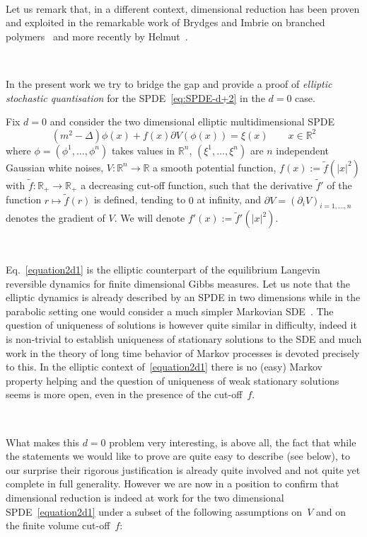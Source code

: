 \documentclass[a4paper,10pt]{article}
\newcommand{\assign}{:=}
\newcommand{\tmtextit}[1]{{\itshape{#1}}}
\begin{document}
\

Let us remark that, in a different context, dimensional reduction has been
proven and exploited in the remarkable work of Brydges and Imbrie on branched
polymers~{\cite{brydges_branched_2003,brydges_dimensional_2003}} and more
recently by Helmut~{\cite{helmuth_dimensional_2016}}.
 
\

In the present work we try to bridge the gap and provide a proof of
\tmtextit{elliptic stochastic quantisation} for the SPDE~{\eqref{eq:SPDE-d+2}}
in the $d = 0$ case.

Fix $d = 0$ and consider the two dimensional elliptic multidimensional SPDE
\begin{equation}
  (m^2 - \Delta) \phi (x) + f (x) \partial V (\phi (x)) = \xi (x)
  \label{equation2d1} \qquad x \in \mathbb{R}^2
\end{equation}
where $\phi = (\phi^1, \ldots, \phi^n)$ takes values in $\mathbb{R}^n$,
$(\xi^1, \ldots, \xi^n)$ are $n$ independent Gaussian white noises, $V :
\mathbb{R}^n \rightarrow \mathbb{R}$ a smooth potential function, $f (x)
\assign \tilde{f} (| x |^2)$ with $\tilde{f} : \mathbb{R}_+ \rightarrow
\mathbb{R}_+$ a decreasing cut-off function, such that the derivative
$\tilde{f}'$ of the function $r \longmapsto \tilde{f} (r)$ is defined, tending
to $0$ at infinity, and $\partial V = (\partial_i V)_{i = 1, \ldots, n}$
denotes the gradient of $V$. We will denote $f' (x) \assign \tilde{f}' (| x
|^2)$.

\

Eq.~{\eqref{equation2d1}} is the elliptic counterpart of the equilibrium
Langevin reversible dynamics for finite dimensional Gibbs measures. Let us
note that the elliptic dynamics is already described by an SPDE in two
dimensions while in the parabolic setting one would consider a much simpler
Markovian SDE~{\cite{iwata_infinite_1987,albeverio_strong_2012}}. The question
of uniqueness of solutions is however quite similar in difficulty, indeed it
is non-trivial to establish uniqueness of stationary solutions to the SDE and
much work in the theory of long time behavior of Markov processes is devoted
precisely to this. In the elliptic context of~{\eqref{equation2d1}} there is
no (easy) Markov property helping and the question of uniqueness of weak
stationary solutions seems is more open, even in the presence of the
cut-off~$f$.

\

What makes this $d = 0$ problem very interesting, is above all, the fact that
while the statements we would like to prove are quite easy to describe (see
below), to our surprise their rigorous justification is already quite involved
and not quite yet complete in full generality. However we are now in a
position to confirm that dimensional reduction is indeed at work for the two
dimensional SPDE~{\eqref{equation2d1}} under a subset of the following
assumptions on~$V$ and on the finite volume cut-off~$f$:
\end{document}
